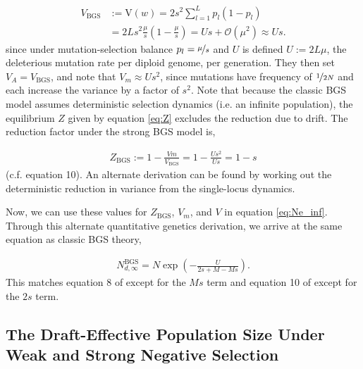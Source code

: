 \documentclass[11pt]{article}
\newcommand{\V}{\text{V}}
\begin{document}
\begin{align}
  \label{supp-eq:va_bgs}
  V_\text{BGS} &:= \V(w) = 2 s^2 \sum_{l=1}^L p_l(1-p_l) \nonumber  \\
            &= 2 L s^2 \frac{\mu}{s} \left( 1 - \frac{\mu}{s}\right) = U s + \mathcal{O}(\mu^2) \approx Us.
\end{align}
%
since under mutation-selection balance $p_l = \nicefrac{\mu}{s}$ and $U$ is
defined $U := 2 L \mu$, the deleterious mutation rate per diploid genome, per
generation. They then set $V_A = V_\text{BGS}$, and note that $V_m \approx
Us^2$, since mutations have frequency of $\nicefrac{1}{2N}$ and each increase
the variance by a factor of $s^2$. Note that because the classic BGS model
assumes deterministic selection dynamics (i.e. an infinite population), the
equilibrium $Z$ given by equation \eqref{eq:Z} excludes the reduction due to
drift. The reduction factor under the strong BGS model is,

\begin{align}
  Z_\text{BGS} := 1 - \frac{Vm}{V_\text{BGS}} = 1 - \frac{Us^2}{Us} = 1 - s
\end{align}
%
(c.f. \cite{Santiago1998-bs} equation 10). An alternate derivation can be found
by working out the deterministic reduction in variance from the single-locus
dynamics. 

Now, we can use these values for $Z_\text{BGS}$, $V_m$, and $V$ in equation
\eqref{eq:Ne_inf}. Through this alternate quantitative genetics derivation, we
arrive at the same equation as classic BGS theory,

\begin{align}
  N_{d,\infty}^\text{BGS} = N \exp\left( - \frac{U}{2s + M - Ms} \right).
\end{align}
%
This matches equation 8 of \textcite{Hudson1995-xc} except for the $Ms$ term
and equation 10 of \textcite{Nordborg1996-nq} except for the $2s$ term.

\subsection{The Draft-Effective Population Size Under Weak and Strong Negative Selection}
\label{supp:weak-strong}
\end{document}
